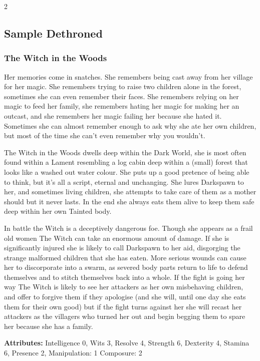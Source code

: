 \begin{multicols}{2}
\subsection*{Sample Dethroned}

\subsubsection*{The Witch in the Woods}

Her memories come in snatches. She remembers being cast away from her village for her magic. She remembers trying to raise two children alone in the forest, sometimes she can even remember their faces. She remembers relying on her magic to feed her family, she remembers hating her magic for making her an outcast, and she remembers her magic failing her because she hated it. Sometimes she can almost remember enough to ask why she ate her own children, but most of the time she can't even remember why you wouldn't. 

The Witch in the Woods dwells deep within the Dark World, she is most often found within a Lament resembling a log cabin deep within a (small) forest that looks like a washed out water colour. She puts up a good pretence of being able to think, but it's all a script, eternal and unchanging. She lures Darkspawn to her, and sometimes living children, she attempts to take care of them as a mother should but it never lasts. In the end she always eats them alive to keep them safe deep within her own Tainted body. 

In battle the Witch is a deceptively dangerous foe. Though she appears as a frail old women The Witch can take an enormous amount of damage. If she is significantly injured she is likely to call Darkspawn to her aid, disgorging the strange malformed children that she has eaten. More serious wounds can cause her to discorporate into a swarm, as severed body parts return to life to defend themselves and to stitch themselves back into a whole. If the fight is going her way The Witch is likely to see her attackers as her own misbehaving children, and offer to forgive them if they apologise (and she will, until one day she eats them for their own good) but if the fight turns against her she will recast her attackers as the villagers who turned her out and begin begging them to spare her because she has a family. 

\noindent \textbf{Attributes:} Intelligence 0, Wits 3, Resolve 4, Strength 6, Dexterity 4, Stamina 6, Presence 2, Manipulation: 1 Composure: 2


\end{multicols}
